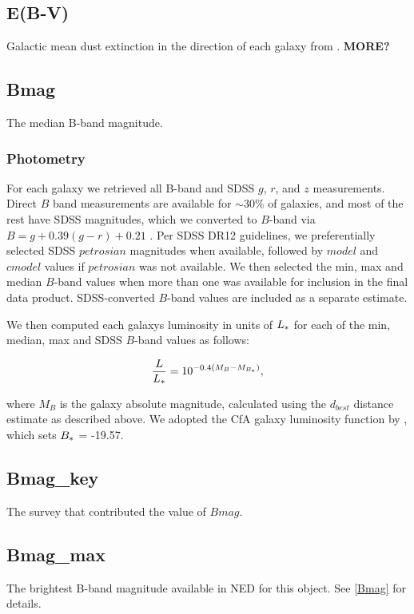 \documentclass[iop]{emulateapj-rtx4}
\begin{document}
\subsection{E(B-V)}
Galactic mean dust extinction in the direction of each galaxy from \cite{schlafly2011}. \textbf{MORE?}


\subsection{Bmag}
The median B-band magnitude.

\subsubsection{Photometry}
For each galaxy we retrieved all B-band and SDSS $g$, $r$, and $z$ measurements. Direct $B$ band measurements are available for $\sim 30\%$ of galaxies, and most of the rest have SDSS magnitudes, which we converted to $B$-band via $B = g + 0.39 (g-r) + 0.21$ \citep{jester2005}. Per SDSS DR12 guidelines, we preferentially selected SDSS $petrosian$ magnitudes when available, followed by $model$ and $cmodel$ values if $petrosian$ was not available. We then selected the min, max and median $B$-band values when more than one was available for inclusion in the final data product. SDSS-converted $B$-band values are included as a separate estimate. 

We then computed each galaxys luminosity in units of $L_{\**}$ for each of the min, median, max and SDSS $B$-band values as follows:

\begin{equation}
	\frac{L}{L_{\**}} = 10^{-0.4 (M_{B} - M_{B_{\**}})},
	\label{lstar}
\end{equation}

where $M_B$ is the galaxy absolute magnitude, calculated using the $d_{best}$ distance estimate as described above. We adopted the CfA galaxy luminosity function by \citep{marzke1994}, which sets $B_{\**} $ = -19.57. 


\subsection{Bmag\_key}
The survey that contributed the value of $Bmag$.

\subsection{Bmag\_max}
The brightest B-band magnitude available in NED for this object. See \ref{Bmag} for details.
\end{document}
